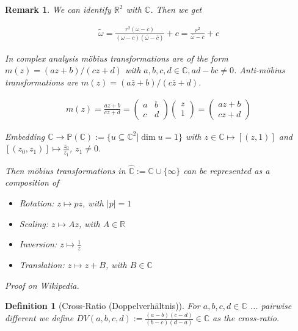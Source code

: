 \documentclass[]{article}
\newtheorem{definition}{Definition}
\newtheorem{remark}{Remark}
\begin{document}
\begin{remark}
	We can identify $\mathbb{R}^2$ with $\mathbb{C}$. Then we get
	
	\begin{align*}
		\tilde{\omega} = \frac{r^2(\omega - c)}{(\omega - c)(\bar{\omega} - \bar{c})} + c = \frac{r^2}{\bar{\omega} - \bar{c}} + c
	\end{align*}
	
	In complex analysis möbius transformations are of the form $m(z) = (az+b)/(cz+d)$ with $a,b,c,d \in \mathbb{C}, ad-bc \neq 0$.  Anti-möbius transformations are $m(z) = (a\bar{z}+b)/(c\bar{z}+d)$.
	
	\begin{align*}
		m(z) = \frac{az+b}{cz+d} = \left(\begin{matrix}
			a & b\\ c & d
		\end{matrix}\right) \left(\begin{matrix}
		z\\ 1
		\end{matrix}\right) = \left(\begin{matrix}
		az+b\\ cz+d
		\end{matrix}\right)
	\end{align*}
	
	Embedding $\mathbb{C} \rightarrow \mathbb{P}(\mathbb{C}) := \{u \subseteq \mathbb{C}^2 | \dim u = 1\}$ with $z \in \mathbb{C} \mapsto [(z, 1)]$ and $[(z_0, z_1)] \mapsto \frac{z_0}{z_1}$, $z_1 \neq 0$.
	
	Then möbius transformations in $\hat{\mathbb{C}} := \mathbb{C} \cup \{\infty\}$ can be represented as a composition of
	
	\begin{itemize}
		\item Rotation: $z \mapsto pz$, with $|p|=1$
		\item Scaling: $z \mapsto Az$, with $A \in \mathbb{R}$
		\item Inversion: $z \mapsto \frac{1}{z}$
		\item Translation: $z \mapsto z + B$, with $B \in \mathbb{C}$
	\end{itemize}

	Proof on Wikipedia.	 
\end{remark}

\begin{definition}[Cross-Ratio (Doppelverhältnis)]
	For $a,b,c,d \in \mathbb{C}$ ... pairwise different we define $DV(a,b,c,d) := \frac{(a-b)(c-d)}{(b-c)(d-a)} \in \mathbb{C}$ as the cross-ratio.
\end{definition}
\end{document}
